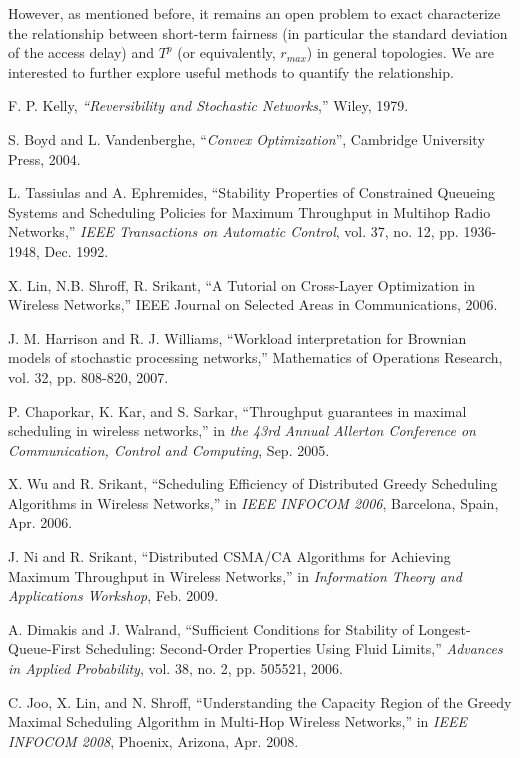 \documentclass{IEEEtran}
\begin{document}
However, as mentioned before, it remains an open problem to exact
characterize the relationship between short-term fairness (in particular
the standard deviation of the access delay) and $T^{p}$ (or equivalently,
$r_{max}$) in general topologies. We are interested to further explore
useful methods to quantify the relationship.
\begin{thebibliography}{32}
F. P. Kelly, \emph{{}``Reversibility and Stochastic
Networks},'' Wiley, 1979.

S. Boyd and L. Vandenberghe, {}``\emph{Convex
Optimization}'', Cambridge University Press, 2004.

L. Tassiulas and A. Ephremides, {}``Stability Properties
of Constrained Queueing Systems and Scheduling Policies for Maximum
Throughput in Multihop Radio Networks,'' \emph{IEEE Transactions
on Automatic Control}, vol. 37, no. 12, pp. 1936-1948, Dec. 1992.

X. Lin, N.B. Shroff, R. Srikant, {}``A Tutorial
on Cross-Layer Optimization in Wireless Networks,'' IEEE Journal
on Selected Areas in Communications, 2006.

J. M. Harrison and R. J. Williams, {}``Workload interpretation
for Brownian models of stochastic processing networks,'' Mathematics
of Operations Research, vol. 32, pp. 808-820, 2007.

P. Chaporkar, K. Kar, and S. Sarkar,
{}``Throughput guarantees in maximal scheduling in wireless networks,''
in \emph{the 43rd Annual Allerton Conference on Communication, Control
and Computing}, Sep. 2005.

X. Wu and R. Srikant, {}``Scheduling Efficiency
of Distributed Greedy Scheduling Algorithms in Wireless Networks,''
in\emph{ IEEE INFOCOM 2006}, Barcelona, Spain, Apr. 2006.

J. Ni and R. Srikant, \textquotedblleft{}Distributed
CSMA/CA Algorithms for Achieving Maximum Throughput in Wireless Networks,\textquotedblright{}
in\emph{ Information Theory and Applications Workshop}, Feb. 2009.

A. Dimakis and J. Walrand, {}``Sufficient Conditions
for Stability of Longest-Queue-First Scheduling: Second-Order Properties
Using Fluid Limits,'' \emph{Advances in Applied Probability}, vol.
38, no. 2, pp. 505\textendash{}521, 2006.

C. Joo, X. Lin, and N. Shroff, {}``Understanding the
Capacity Region of the Greedy Maximal Scheduling Algorithm in Multi-Hop
Wireless Networks,'' in \emph{IEEE INFOCOM 2008}, Phoenix, Arizona,
Apr. 2008.


\end{thebibliography}
\end{document}
